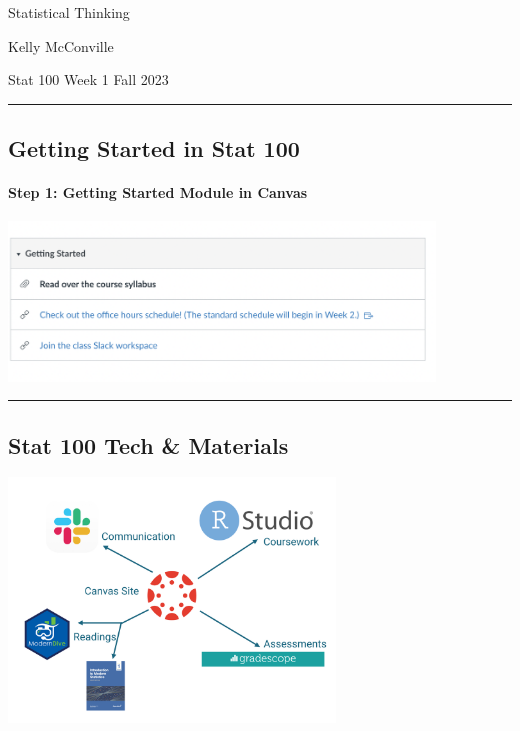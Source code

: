 \documentclass[
  letterpaper,
  DIV=11,
  numbers=noendperiod]{scrartcl}
\let\oldparagraph\paragraph
\renewcommand{\paragraph}[1]{\oldparagraph{#1}\mbox{}}
\begin{document}
{Statistical Thinking}

{Kelly McConville}

{Stat 100 Week 1 \textbar{} Fall 2023}

\begin{center}\rule{0.5\linewidth}{0.5pt}\end{center}

\hypertarget{getting-started-in-stat-100}{%
\subsection{Getting Started in Stat
100}\label{getting-started-in-stat-100}}

\hypertarget{step-1-getting-started-module-in-canvas}{%
\paragraph{Step 1: Getting Started Module in
Canvas}\label{step-1-getting-started-module-in-canvas}}

\includegraphics[width=0.85\textwidth,height=\textheight]{img/Canvas_getting_started.png}

\begin{center}\rule{0.5\linewidth}{0.5pt}\end{center}

\hypertarget{stat-100-tech-materials}{%
\subsection{Stat 100 Tech \& Materials}\label{stat-100-tech-materials}}

\includegraphics[width=0.65\textwidth,height=\textheight]{img/structures.001.jpeg}
\end{document}
